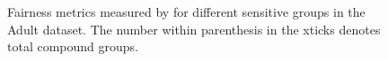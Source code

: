 \begin{figure}
	\centering
	\caption[Fairness verification on compound sensitive groups]{Fairness metrics measured by {\justicia} for different sensitive groups in the Adult dataset. The number within parenthesis in the xticks denotes total compound groups.}
	\label{fairness_justicia_fig:sensitive_groups}
\end{figure}



